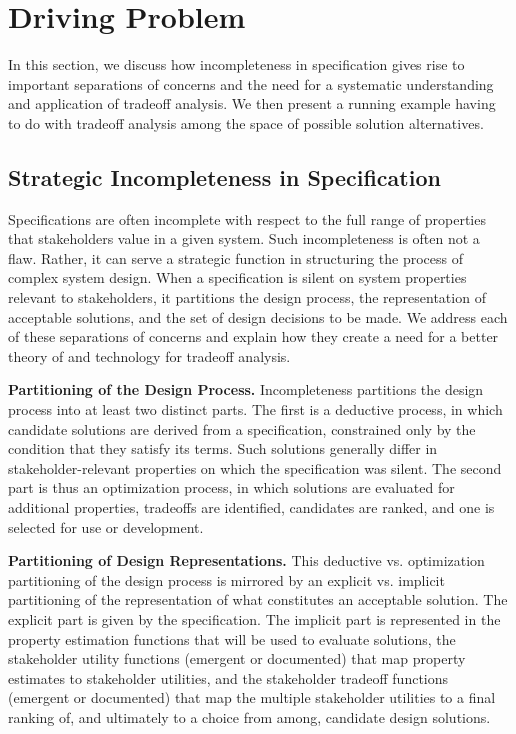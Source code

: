 \documentclass{sig-alternate}
\begin{document}

\section{Driving Problem}
\label{problem}

In this section, we discuss how incompleteness in specification gives rise to important separations of concerns and the need for a systematic understanding and application of tradeoff analysis. We then present a running example having to do with tradeoff analysis among the space of possible solution alternatives.

\subsection{Strategic Incompleteness in Specification} Specifications are often incomplete with respect to the full range of properties that stakeholders value in a given system. Such incompleteness is often not a flaw. Rather, it can serve a strategic function in structuring the process of complex system design. When a specification is silent on system properties relevant to stakeholders, it partitions the design process, the representation of acceptable solutions, and the set of design decisions to be made. We address each of these separations of concerns and explain how they create a need for a better theory of and technology for tradeoff analysis.

\textbf{Partitioning of the Design Process.}
Incompleteness partitions the design process into at least two distinct parts. The first is a deductive process, in which candidate solutions are derived from a specification, constrained only by the condition that they satisfy its terms. Such solutions generally differ in stakeholder-relevant properties on which the specification was silent. The second part is thus an optimization process, in which solutions are evaluated for additional properties, tradeoffs are identified, candidates are ranked, and one is selected for use or development.


\textbf{Partitioning of Design Representations.}
This deductive vs. optimization partitioning of the design process is mirrored by an explicit vs. implicit partitioning of the representation of what constitutes an acceptable solution. The explicit part is given by the specification. The implicit part is represented in the property estimation functions that will be used to evaluate solutions, the stakeholder utility functions (emergent or documented) that map property estimates to stakeholder utilities, and the stakeholder tradeoff functions (emergent or documented) that map the multiple stakeholder utilities to a final ranking of, and ultimately to a choice from among, candidate design solutions.  
\end{document}
